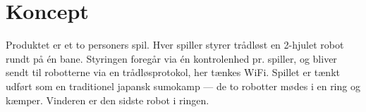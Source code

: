 
\section{Koncept}

Produktet er et to personers spil. Hver spiller styrer trådløst en 2-hjulet robot rundt på én bane. 
Styringen foregår via én kontrolenhed pr. spiller, og bliver sendt til robotterne via en trådløsprotokol, her tænkes WiFi. Spillet er tænkt udført som en traditionel japansk sumokamp --- de to robotter mødes i en ring og kæmper. Vinderen er den sidste robot i ringen.
